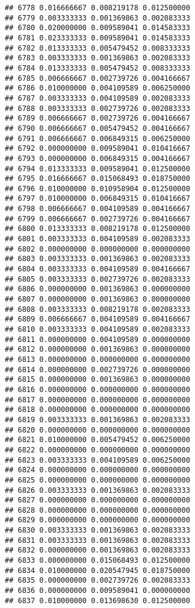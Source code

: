\documentclass[
]{article}
\begin{document}
\begin{verbatim}
## 6778 0.016666667 0.008219178 0.012500000
## 6779 0.003333333 0.001369863 0.002083333
## 6780 0.020000000 0.009589041 0.014583333
## 6781 0.023333333 0.009589041 0.014583333
## 6782 0.013333333 0.005479452 0.008333333
## 6783 0.003333333 0.001369863 0.002083333
## 6784 0.013333333 0.005479452 0.008333333
## 6785 0.006666667 0.002739726 0.004166667
## 6786 0.010000000 0.004109589 0.006250000
## 6787 0.003333333 0.004109589 0.002083333
## 6788 0.003333333 0.002739726 0.002083333
## 6789 0.006666667 0.002739726 0.004166667
## 6790 0.006666667 0.005479452 0.004166667
## 6791 0.006666667 0.006849315 0.006250000
## 6792 0.000000000 0.009589041 0.010416667
## 6793 0.000000000 0.006849315 0.004166667
## 6794 0.013333333 0.009589041 0.012500000
## 6795 0.016666667 0.015068493 0.018750000
## 6796 0.010000000 0.010958904 0.012500000
## 6797 0.010000000 0.006849315 0.010416667
## 6798 0.006666667 0.004109589 0.004166667
## 6799 0.006666667 0.002739726 0.004166667
## 6800 0.013333333 0.008219178 0.012500000
## 6801 0.003333333 0.004109589 0.002083333
## 6802 0.000000000 0.000000000 0.000000000
## 6803 0.003333333 0.001369863 0.002083333
## 6804 0.003333333 0.004109589 0.004166667
## 6805 0.003333333 0.002739726 0.002083333
## 6806 0.000000000 0.001369863 0.000000000
## 6807 0.000000000 0.001369863 0.000000000
## 6808 0.003333333 0.008219178 0.002083333
## 6809 0.006666667 0.004109589 0.004166667
## 6810 0.003333333 0.004109589 0.002083333
## 6811 0.000000000 0.004109589 0.000000000
## 6812 0.000000000 0.001369863 0.000000000
## 6813 0.000000000 0.000000000 0.000000000
## 6814 0.000000000 0.002739726 0.000000000
## 6815 0.000000000 0.001369863 0.000000000
## 6816 0.000000000 0.000000000 0.000000000
## 6817 0.000000000 0.000000000 0.000000000
## 6818 0.000000000 0.000000000 0.000000000
## 6819 0.003333333 0.001369863 0.002083333
## 6820 0.000000000 0.000000000 0.000000000
## 6821 0.010000000 0.005479452 0.006250000
## 6822 0.000000000 0.000000000 0.000000000
## 6823 0.003333333 0.004109589 0.006250000
## 6824 0.000000000 0.000000000 0.000000000
## 6825 0.000000000 0.000000000 0.000000000
## 6826 0.003333333 0.001369863 0.002083333
## 6827 0.000000000 0.000000000 0.000000000
## 6828 0.000000000 0.000000000 0.000000000
## 6829 0.000000000 0.000000000 0.000000000
## 6830 0.003333333 0.001369863 0.002083333
## 6831 0.003333333 0.001369863 0.002083333
## 6832 0.000000000 0.001369863 0.002083333
## 6833 0.000000000 0.015068493 0.012500000
## 6834 0.010000000 0.020547945 0.018750000
## 6835 0.000000000 0.002739726 0.002083333
## 6836 0.000000000 0.009589041 0.000000000
## 6837 0.010000000 0.013698630 0.012500000

\end{verbatim}
\end{document}
